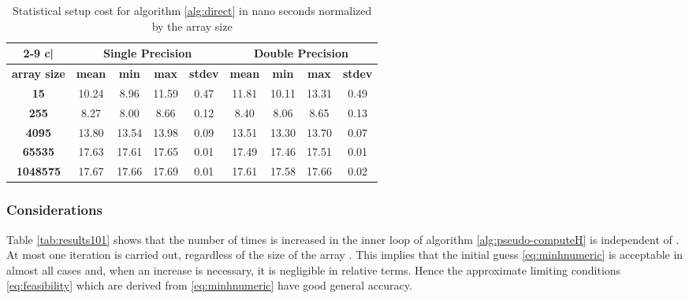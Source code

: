 \documentclass[preprint,1p,times]{elsarticle}
\begin{document}
\begin{table}[ht]
	\centering
	\footnotesize
	\begin{tabular}{| c | c c c c | c c c c |}
		\cline{2-9}
		\multicolumn{1} {c|}{}  & \multicolumn{4}{c|}{\textbf{Single Precision}}  & \multicolumn{4}{c|}{\textbf{Double Precision}} \\
		\hline
		\textbf{array size} & \textbf{mean} & \textbf{min} & \textbf{max} & \textbf{stdev} & \textbf{mean} & \textbf{min} & \textbf{max} & \textbf{stdev} \\
		\hline
		\multicolumn{1}{|c|}{\textbf{15}                                    } &      10.24 &       8.96 &      11.59 &       0.47 &      11.81 &      10.11 &      13.31 &       0.49 \\
		\multicolumn{1}{|c|}{\textbf{255}                                   } &       8.27 &       8.00 &       8.66 &       0.12 &       8.40 &       8.06 &       8.65 &       0.13 \\
		\multicolumn{1}{|c|}{\textbf{4095}                                  } &      13.80 &      13.54 &      13.98 &       0.09 &      13.51 &      13.30 &      13.70 &       0.07 \\
		\multicolumn{1}{|c|}{\textbf{65535}                                 } &      17.63 &      17.61 &      17.65 &       0.01 &      17.49 &      17.46 &      17.51 &       0.01 \\
		\multicolumn{1}{|c|}{\textbf{1048575}                               } &      17.67 &      17.66 &      17.69 &       0.01 &      17.61 &      17.58 &      17.66 &       0.02 \\
		\hline
	\end{tabular}
	\caption{Statistical setup cost for algorithm \ref{alg:direct} in nano seconds normalized by the array size}
	\label{tab:results100}
\end{table}

\subsubsection{Considerations}
Table \ref{tab:results101} shows that the number of times  is increased in the inner loop of algorithm \ref{alg:pseudo-computeH} is independent of . At most one iteration is carried out, regardless of the size of the array . This implies that the initial guess \eqref{eq:minhnumeric} is acceptable in almost all cases and, when an increase is necessary, it is negligible in relative terms. Hence the approximate limiting conditions \eqref{eq:feasibility} which are derived from \eqref{eq:minhnumeric} have good general accuracy.
\end{document}
